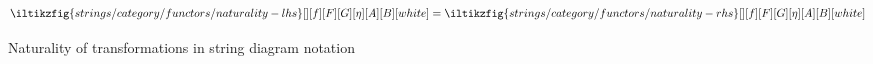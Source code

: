 \begin{figure}
    \begin{gather*}
        \iltikzfig{strings/category/functors/naturality-lhs}[][f][F][G][\eta][A][B][white]
        =
        \iltikzfig{strings/category/functors/naturality-rhs}[][f][F][G][\eta][A][B][white]
    \end{gather*}
    \caption{
        Naturality of transformations in string diagram notation
    }
    \label{fig:naturality-equations}
\end{figure}